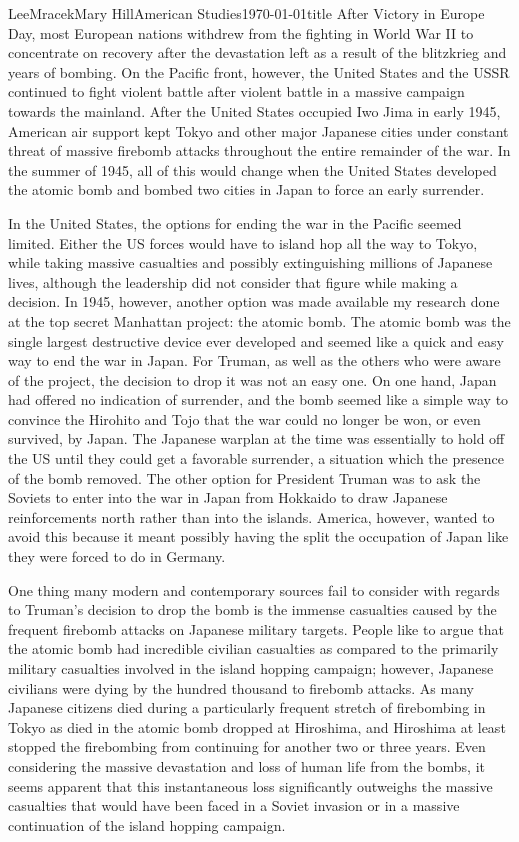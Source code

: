 \documentclass{article}
\begin{document}
\begin{mla}{Lee}{Mracek}{Mary Hill}{American Studies}{\today}{title}
   After Victory in Europe Day, most European nations withdrew from the fighting in World War II to concentrate on recovery after the devastation left as a result of the blitzkrieg and years of bombing. On the Pacific front, however, the United States and the USSR continued to fight violent battle after violent battle in a massive campaign towards the mainland. After the United States occupied Iwo Jima in early 1945, American air support kept Tokyo and other major Japanese cities under constant threat of massive firebomb attacks throughout the entire remainder of the war. In the summer of 1945, all of this would change when the United States developed the atomic bomb and bombed two cities in Japan to force an early surrender.

   In the United States, the options for ending the war in the Pacific seemed limited. Either the US forces would have to island hop all the way to Tokyo, while taking massive casualties and possibly extinguishing millions of Japanese lives, although the leadership did not consider that figure while making a decision. In 1945, however, another option was made available my research done at the top secret Manhattan project: the atomic bomb. The atomic bomb was the single largest destructive device ever developed and seemed like a quick and easy way to end the war in Japan. For Truman, as well as the others who were aware of the project, the decision to drop it was not an easy one. On one hand, Japan had offered no indication of surrender, and the bomb seemed like a simple way to convince the Hirohito and Tojo that the war could no longer be won, or even survived, by Japan. The Japanese warplan at the time was essentially to hold off the US until they could get a favorable surrender, a situation which the presence of the bomb removed. The other option for President Truman was to ask the Soviets to enter into the war in Japan from Hokkaido to draw Japanese reinforcements north rather than into the islands. America, however, wanted to avoid this because it meant possibly having the split the occupation of Japan like they were forced to do in Germany.

   One thing many modern and contemporary sources fail to consider with regards to Truman's decision to drop the bomb is the immense casualties caused by the frequent firebomb attacks on Japanese military targets. People like to argue that the atomic bomb had incredible civilian casualties as compared to the primarily military casualties involved in the island hopping campaign; however, Japanese civilians were dying by the hundred thousand to firebomb attacks. As many Japanese citizens died during a particularly frequent stretch of firebombing in Tokyo as died in the atomic bomb dropped at Hiroshima, and Hiroshima at least stopped the firebombing from continuing for another two or three years. Even considering the massive devastation and loss of human life from the bombs, it seems apparent that this instantaneous loss significantly outweighs the massive casualties that would have been faced in a Soviet invasion or in a massive continuation of the island hopping campaign.


\end{mla}
\end{document}
